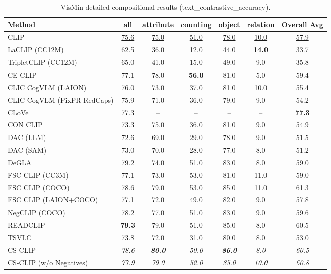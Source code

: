 \begin{table}[t]
  \centering
  \scriptsize
  \caption{VisMin detailed compositional results (text_contrastive_accuracy).}
  \label{tab:VisMin_detailed}
  \begin{adjustbox}{max width=\textwidth}
  \setlength{\tabcolsep}{2pt}
  \begin{tabular}{p{5cm}c|c|c|c|c|c}
    \toprule
    Method & all & attribute & counting & object & relation & Overall Avg \\
    \midrule
    CLIP & \underline{75.6} & \underline{75.0} & \underline{51.0} & \underline{78.0} & \underline{10.0} & \underline{57.9} \\
    \midrule
    LaCLIP (CC12M) & 62.5 & 36.0 & 12.0 & 44.0 & \textbf{14.0} & 33.7 \\
    TripletCLIP (CC12M) & 65.0 & 41.0 & 15.0 & 49.0 & 9.0 & 35.8 \\
    \midrule
    CE CLIP & 77.1 & 78.0 & \textbf{56.0} & 81.0 & 5.0 & 59.4 \\
    CLIC CogVLM (LAION) & 76.0 & 73.0 & 37.0 & 81.0 & 10.0 & 55.4 \\
    CLIC CogVLM (PixPR RedCaps) & 75.9 & 71.0 & 36.0 & 79.0 & 9.0 & 54.2 \\
    CLoVe & 77.3 & -- & -- & -- & -- & \textbf{77.3} \\
    CON CLIP & 73.3 & 75.0 & 36.0 & 81.0 & 9.0 & 54.9 \\
    DAC (LLM) & 72.6 & 69.0 & 29.0 & 78.0 & 9.0 & 51.5 \\
    DAC (SAM) & 73.0 & 70.0 & 28.0 & 77.0 & 8.0 & 51.2 \\
    DeGLA & 79.2 & 74.0 & 51.0 & 83.0 & 8.0 & 59.0 \\
    FSC CLIP (CC3M) & 77.1 & 73.0 & 53.0 & 81.0 & 11.0 & 59.0 \\
    FSC CLIP (COCO) & 78.6 & 79.0 & 53.0 & 85.0 & 11.0 & 61.3 \\
    FSC CLIP (LAION+COCO) & 77.1 & 72.0 & 49.0 & 82.0 & 9.0 & 57.8 \\
    NegCLIP (COCO) & 78.2 & 77.0 & 51.0 & 83.0 & 9.0 & 59.6 \\
    READCLIP & \textbf{79.3} & 79.0 & 51.0 & 85.0 & 8.0 & 60.5 \\
    TSVLC & 73.8 & 72.0 & 31.0 & 80.0 & 8.0 & 53.0 \\
    \midrule
    CS-CLIP & \emph{78.6} & \emph{\textbf{80.0}} & \emph{50.0} & \emph{\textbf{86.0}} & \emph{8.0} & \emph{60.5} \\
    CS-CLIP (w/o Negatives) & \emph{77.9} & \emph{79.0} & \emph{52.0} & \emph{85.0} & \emph{10.0} & \emph{60.8} \\
    \bottomrule
  \end{tabular}
  \end{adjustbox}
\end{table}
